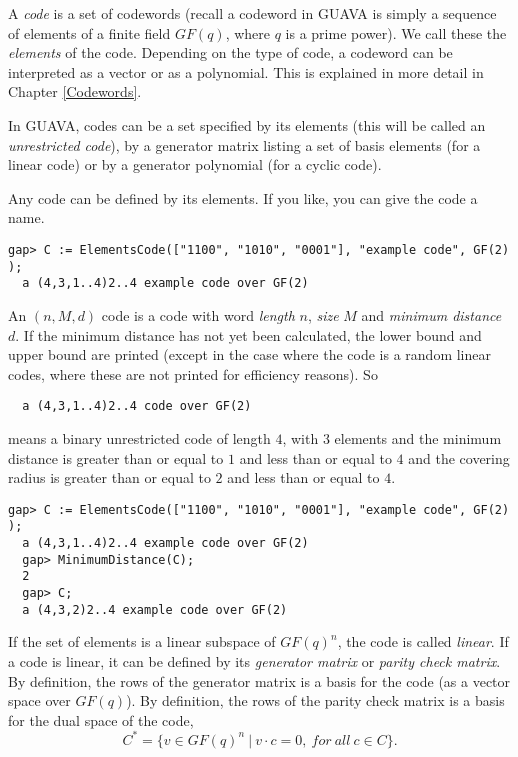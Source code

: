\documentclass[a4paper,11pt]{report}
\begin{document}
{
  \label{Codes} A \emph{code} is a set of codewords (recall a   codeword in \textsf{GUAVA} is simply a sequence of elements of a finite field $GF(q)$, where $q$ is a prime power). We call these the \emph{elements} of the code. Depending on the type of code, a codeword can be interpreted as a
vector or as a polynomial. This is explained in more detail in Chapter \ref{Codewords}. 

 In \textsf{GUAVA}, codes can be a set specified by its elements (this will be called an \emph{unrestricted code}),  by a generator matrix listing a set of basis elements (for a linear code) or
by a generator polynomial (for a cyclic code). 

 Any code can be defined by its elements. If you like, you can give the code a
name. 
\begin{Verbatim}[fontsize=\small,frame=single,label=Example]
  gap> C := ElementsCode(["1100", "1010", "0001"], "example code", GF(2) );
  a (4,3,1..4)2..4 example code over GF(2) 
\end{Verbatim}
 An $(n,M,d)$ code is a code with word \emph{length} $n$, \emph{size} $M$ and \emph{minimum distance} $d$.     If the minimum distance has not yet been calculated, the lower bound and upper
bound are printed (except in the case where the code is a random linear codes,
where these are not printed for efficiency reasons). So 
\begin{verbatim}  
  a (4,3,1..4)2..4 code over GF(2)
\end{verbatim}
 means a binary unrestricted code of length $4$, with $3$ elements and the minimum distance is greater than or equal to $1$ and less than or equal to $4$ and the covering radius is greater than or equal to $2$ and less than or equal to $4$. 
\begin{Verbatim}[fontsize=\small,frame=single,label=Example]
  gap> C := ElementsCode(["1100", "1010", "0001"], "example code", GF(2) );
  a (4,3,1..4)2..4 example code over GF(2) 
  gap> MinimumDistance(C);
  2
  gap> C;
  a (4,3,2)2..4 example code over GF(2) 
\end{Verbatim}
  If the set of elements is a linear subspace of $GF(q)^n$, the code is called \emph{linear}. If a code is linear, it can be defined by its \emph{generator matrix} or \emph{parity check matrix}.   By definition, the rows of the generator matrix is a basis for the code (as a
vector space over $GF(q)$). By definition, the rows of the parity check matrix is a basis for the dual
space of the code, 
\[ C^* = \{ v \in GF(q)^n\ |\ v\cdot c = 0,\ for \ all\ c \in C \}. \]
 
}
\end{document}
